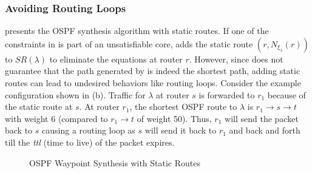 \subsubsection{Avoiding Routing Loops} \label{sec:loopavoidance}
 presents the OSPF 
synthesis algorithm with static routes.  
If one of the constraints in  is part of an unsatisfiable  
core, \name adds the static 
route
 $(r, N_{\xi_\lambda}(r))$ to
$SR(\lambda)$ to eliminate the equations at router $r$. 
However, since  does not 
guarantee that the path generated
by \genesis is indeed the shortest path, adding
static routes can lead to undesired behaviors like routing loops.  
Consider the example configuration shown in (b). 
Traffic for $\lambda$ at router $s$ is forwarded to $r_1$ because of the
static route at $s$. At router $r_1$, the shortest OSPF route to
$\lambda$ is $r_1 \rightarrow s \rightarrow t$ with weight 6 (compared 
to $r_1 \rightarrow t$ of weight 50). Thus, $r_1$ will send the 
packet back to $s$  causing a routing loop as $s$ will send
it back to $r_1$ and back and forth till the \emph{ttl} (time to live) of the
packet expires. 

\begin{figure}[t]
	\begin{minipage}{\columnwidth}
		\begin{algorithm}[H]
			\begin{footnotesize} 
				\caption{OSPF Waypoint Synthesis with Static Routes}
				\label{alg:wayptunsat}
				\begin{algorithmic}[1]
					\EndWhile
					\EndProcedure
				\end{algorithmic}
			\end{footnotesize}
		\end{algorithm}
	\end{minipage}
\end{figure}



